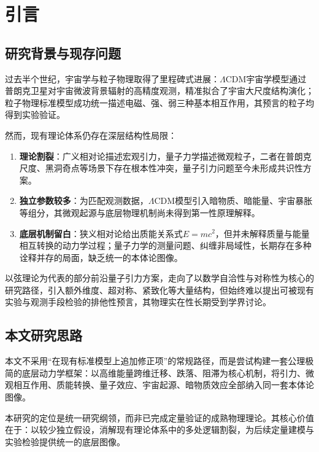 \documentclass[UTF8]{csoarticle}
\affil{1} 济南立心数字科技有限公司，济南　250000
\affil{1} Jinan Lixin Digital Technology Co., Ltd., Jinan 250000, China
\begin{document}
\maketitle

\section{引言}
\subsection{研究背景与现存问题}
过去半个世纪，宇宙学与粒子物理取得了里程碑式进展：$\Lambda$CDM宇宙学模型通过普朗克卫星对宇宙微波背景辐射的高精度观测，精准拟合了宇宙大尺度结构演化；粒子物理标准模型成功统一描述电磁、强、弱三种基本相互作用，其预言的粒子均得到实验验证。

然而，现有理论体系仍存在深层结构性局限：
\begin{enumerate}
\item \textbf{理论割裂}：广义相对论描述宏观引力，量子力学描述微观粒子，二者在普朗克尺度、黑洞奇点等场景下存在根本性冲突，量子引力问题至今未形成共识性方案。
\item \textbf{独立参数较多}：为匹配观测数据，$\Lambda$CDM模型引入暗物质、暗能量、宇宙暴胀等组分，其微观起源与底层物理机制尚未得到第一性原理解释。
\item \textbf{底层机制留白}：狭义相对论给出质能关系式$E=mc^2$，但并未解释质量与能量相互转换的动力学过程；量子力学的测量问题、纠缠非局域性，长期存在多种诠释并存的局面，缺乏统一的本体论图像。
\end{enumerate}

以弦理论为代表的部分前沿量子引力方案，走向了以数学自洽性与对称性为核心的研究路径，引入额外维度、超对称、紧致化等大量结构，但始终难以提出可被现有实验与观测手段检验的排他性预言，其物理实在性长期受到学界讨论。

\subsection{本文研究思路}
本文不采用“在现有标准模型上追加修正项”的常规路径，而是尝试构建一套公理极简的底层动力学框架：以高维能量跨维迁移、跌落、阻滞为核心机制，将引力、微观相互作用、质能转换、量子效应、宇宙起源、暗物质效应全部纳入同一套本体论图像。

本研究的定位是统一研究纲领，而非已完成定量验证的成熟物理理论。其核心价值在于：以较少独立假设，消解现有理论体系中的多处逻辑割裂，为后续定量建模与实验检验提供统一的底层图像。
\end{document}
